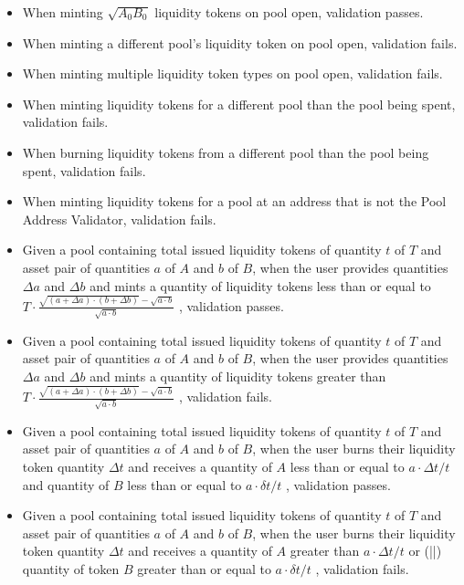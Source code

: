 \documentclass{article}
\begin{document}
\begin{itemize}
	\item When minting $\sqrt{A_0B_0}$ liquidity tokens on pool open, validation passes.
	\item When minting a different pool's liquidity token on pool open, validation fails.
	\item When minting multiple liquidity token types on pool open, validation fails.
	\item When minting liquidity tokens for a different pool than the pool being spent, validation fails.
	\item When burning liquidity tokens from a different pool than the pool being spent, validation fails.
	\item When minting liquidity tokens for a pool at an address that is not the Pool Address Validator, validation fails.
	\item Given a pool containing total issued liquidity tokens of quantity $t$ of $T$ and asset
	      pair of quantities $a$ of $A$ and $b$ of $B$, when the user provides quantities $\Delta a$ and $\Delta b$
  	      and mints a quantity of liquidity tokens less than or equal to
	      $T \cdot \frac{\sqrt{ (a + \Delta a) \cdot (b + \Delta b)} - \sqrt{a \cdot b}}{\sqrt{a \cdot b}}$
	      , validation passes.
	\item Given a pool containing total issued liquidity tokens of quantity $t$ of $T$ and asset
	      pair of quantities $a$ of $A$ and $b$ of $B$, when the user provides quantities $\Delta a$ and $\Delta b$
	      and mints a quantity of liquidity tokens greater than
              $T \cdot \frac{\sqrt{ (a + \Delta a) \cdot (b + \Delta b)} - \sqrt{a \cdot b}}{\sqrt{a \cdot b}}$
	      , validation fails.
	\item Given a pool containing total issued liquidity tokens of quantity $t$ of $T$ and asset pair of quantities
	      $a$ of $A$ and $b$ of $B$, when the user burns
	      their liquidity token quantity $\Delta t$ and receives a quantity of $A$ less than or equal to
	      $ a \cdot \Delta t/t $ and quantity of $B$ less than or equal to $ a \cdot \delta t/t $
	      , validation passes.
	\item Given a pool containing total issued liquidity tokens of quantity $t$ of $T$ and asset
	      pair of quantities $a$ of $A$ and $b$ of $B$, when the user burns
	      their liquidity token quantity $\Delta t$ and receives a quantity of $A$ greater than
	      $ a \cdot \Delta t/t $ or (||) quantity of token $B$ greater than or equal to $ a \cdot \delta t/t $
	      , validation fails.
\end{itemize}
\end{document}
